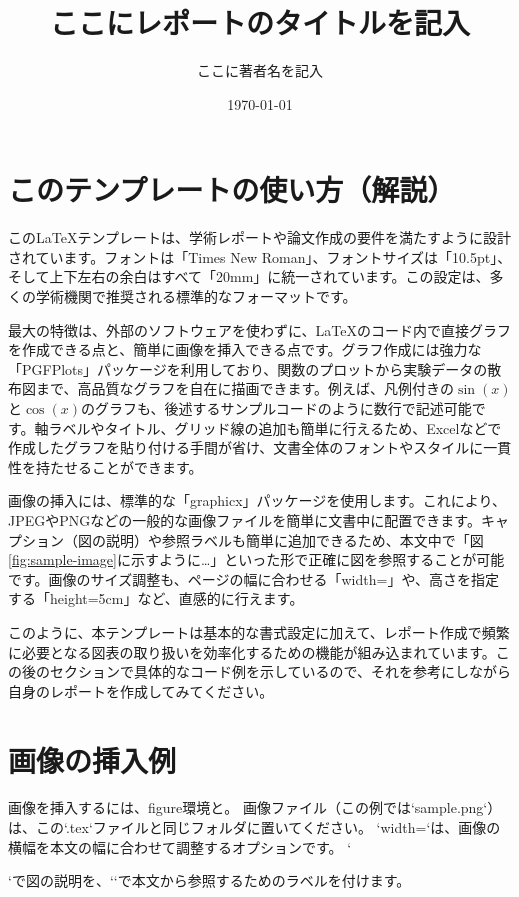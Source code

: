 \documentclass[10.5pt]{jsarticle}
\title{ここにレポートのタイトルを記入}
\author{ここに著者名を記入}
\date{\today} %
\begin{document}
\maketitle %

\section{このテンプレートの使い方（解説）}

このLaTeXテンプレートは、学術レポートや論文作成の要件を満たすように設計されています。フォントは「Times New Roman」、フォントサイズは「10.5pt」、そして上下左右の余白はすべて「20mm」に統一されています。この設定は、多くの学術機関で推奨される標準的なフォーマットです。

最大の特徴は、外部のソフトウェアを使わずに、LaTeXのコード内で直接グラフを作成できる点と、簡単に画像を挿入できる点です。グラフ作成には強力な「PGFPlots」パッケージを利用しており、関数のプロットから実験データの散布図まで、高品質なグラフを自在に描画できます。例えば、凡例付きの$\sin(x)$と$\cos(x)$のグラフも、後述するサンプルコードのように数行で記述可能です。軸ラベルやタイトル、グリッド線の追加も簡単に行えるため、Excelなどで作成したグラフを貼り付ける手間が省け、文書全体のフォントやスタイルに一貫性を持たせることができます。

画像の挿入には、標準的な「graphicx」パッケージを使用します。これにより、JPEGやPNGなどの一般的な画像ファイルを簡単に文書中に配置できます。キャプション（図の説明）や参照ラベルも簡単に追加できるため、本文中で「図\ref{fig:sample-image}に示すように…」といった形で正確に図を参照することが可能です。画像のサイズ調整も、ページの幅に合わせる「width=\linewidth」や、高さを指定する「height=5cm」など、直感的に行えます。

このように、本テンプレートは基本的な書式設定に加えて、レポート作成で頻繁に必要となる図表の取り扱いを効率化するための機能が組み込まれています。この後のセクションで具体的なコード例を示しているので、それを参考にしながら自身のレポートを作成してみてください。

\section{画像の挿入例}

画像を挿入するには、figure環境と。
画像ファイル（この例では`sample.png`）は、この`.tex`ファイルと同じフォルダに置いてください。
`width=\linewidth`は、画像の横幅を本文の幅に合わせて調整するオプションです。
`\caption{}`で図の説明を、`\label{}`で本文から参照するためのラベルを付けます。
\end{document}
